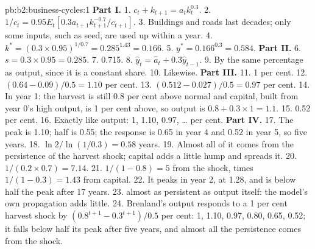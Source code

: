 \begin{solution}{pb:b2:business-cycles:1}
\textbf{Part I.}
1. $c_t + k_{t+1} = a_tk_t^{0.3}$.
2. $1/c_t = 0.95E_t[0.3a_{t+1}k_{t+1}^{-0.7}/c_{t+1}]$.
3. Buildings and roads last decades; only some inputs, such as seed, are used up within a year.
4. $k^* = (0.3 \times 0.95)^{1/0.7} = 0.285^{1.43} = 0.166$.
5. $y^* = 0.166^{0.3} = 0.584$.
\textbf{Part II.}
6. $s = 0.3 \times 0.95 = 0.285$.
7. 0.715.
8. $\hat y_t = \hat a_t + 0.3\hat y_{t-1}$.
9. By the same percentage as output, since it is a constant share.
10. Likewise.
\textbf{Part III.}
11. 1 per cent.
12. $(0.64 - 0.09)/0.5 = 1.10$ per cent.
13. $(0.512 - 0.027)/0.5 = 0.97$ per cent.
14. In year 1: the harvest is still 0.8 per cent above normal and capital, built from year 0's high output, is 1 per cent above, so output is $0.8 + 0.3 \times 1 = 1.1$.
15. 0.52 per cent.
16. Exactly like output: 1, 1.10, 0.97, \ldots{} per cent.
\textbf{Part IV.}
17. The peak is 1.10; half is 0.55; the response is 0.65 in year 4 and 0.52 in year 5, so five years.
18. $\ln 2/\ln(1/0.3) = 0.58$ years.
19. Almost all of it comes from the persistence of the harvest shock; capital adds a little hump and spreads it.
20. $1/(0.2 \times 0.7) = 7.14$.
21. $1/(1 - 0.8) = 5$ from the shock, times $1/(1 - 0.3) = 1.43$ from capital.
22. It peaks in year 2, at 1.28, and is below half the peak after 17 years.
23.  almost as persistent as output itself: the model's own propagation adds little.
24. Brenland's output responds to a 1 per cent harvest shock by $(0.8^{t+1} - 0.3^{t+1})/0.5$ per cent: 1, 1.10, 0.97, 0.80, 0.65, 0.52; it falls below half its peak after five years, and almost all
the persistence comes from the shock.
\end{solution}

